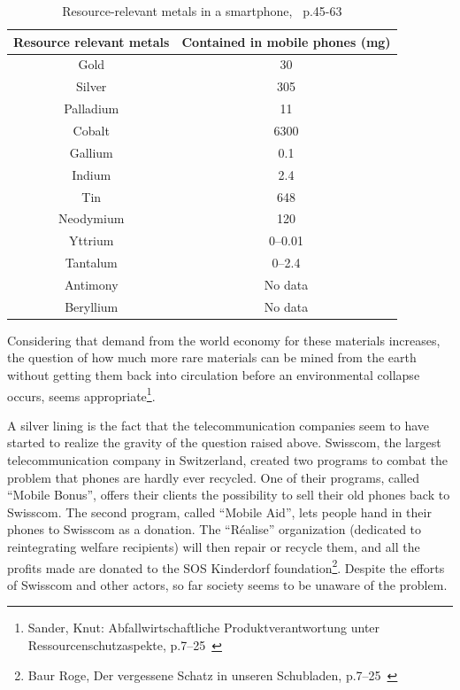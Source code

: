 \documentclass[11pt]{scrartcl}
\begin{document}
\begin{table} [H]
    \centering
    \begin{tabular}{c c}
        \toprule
        Resource relevant metals & Contained in mobile phones (mg) \\ \midrule
        Gold & 30 \\ \midrule
        Silver & 305 \\ \midrule
        Palladium & 11 \\ \midrule
        Cobalt	& 6300 \\ \midrule
        Gallium	& 0.1 \\ \midrule
        Indium	& 2.4 \\ \midrule
        Tin	& 648 \\ \midrule
        Neodymium & 120 \\ \midrule
        Yttrium	& 0--0.01 \\ \midrule
        Tantalum & 0--2.4 \\ \midrule
        Antimony & No data \\ \midrule
        Beryllium & No data \\ \bottomrule
    \end{tabular}
    \caption{Resource-relevant metals in a smartphone,~\cite{Studie} p.45-63}%
    \label{tbl:crit}
\end{table}

Considering that demand from the world economy for these materials increases, the question of how much more rare materials can be mined from the earth without getting them back into circulation before an environmental collapse occurs, seems appropriate\footnote{Sander, Knut: Abfallwirtschaftliche Produktverantwortung unter Ressourcenschutzaspekte, p.7--25~\cite{Studie}}.

A silver lining is the fact that the telecommunication companies seem to have started to realize the gravity of the question raised above. Swisscom, the largest telecommunication company in Switzerland, created two programs to combat the problem that phones are hardly ever recycled. One of their programs, called ``Mobile Bonus'', offers their clients the possibility to sell their old phones back to Swisscom. The second program, called ``Mobile Aid'', lets people hand in their phones to Swisscom as a donation. The ``Réalise'' organization (dedicated to reintegrating welfare recipients) will then repair or recycle them, and all the profits made are donated to the SOS Kinderdorf foundation\footnote{Baur Roge, Der vergessene Schatz in unseren Schubladen, p.7--25~\cite{Swisscom}}. Despite the efforts of Swisscom and other actors, so far society seems to be unaware of the problem.
\end{document}
